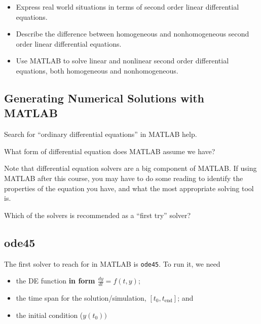 


\newcommand{\Fe}{ F_{\mbox{ext}} }
\newcommand{\Fg}{ F_{\mbox{grav}} }


\setfont
\pagestyle{fancy}
\renewcommand{\Week}{8 }
\renewcommand{\WeekTitle}{\WeekTitleEight }

\fancyhead[LE,RO]{Week \Week}  %
\fancyfoot{}
\sectionbox{Week \#\Week: \WeekTitle}

\vspace{5mm}
\goals
\begin{itemize}
\item Express real world situations in terms of second order linear
  differential equations.
\item Describe the difference between homogeneous and nonhomogeneous
  second order linear differential equations.
\item Use MATLAB to solve linear and nonlinear second order
  differential equations, both homogeneous and nonhomogeneous.
\end{itemize}
\vspace{5mm}

\newpage

\subsection*{Generating Numerical Solutions with MATLAB}

\problem Search for ``ordinary differential equations'' in MATLAB help.  \vsc
\vsc

\problem What form of differential equation does MATLAB assume we have?

\vsc
\vsc


\newpage

Note that differential equation solvers are a big component of MATLAB.
If using MATLAB after this course, you may have to do some reading to
identify the properties of the equation you have, and what the most
appropriate solving tool is.

\problem Which of the solvers is recommended as a ``first try''
solver?

\vsc
\vsc

\newpage

\subsection*{ode45}
The first solver to reach for in MATLAB is \verb#ode45#.  To run it, we need
\begin{itemize} 
\item the DE function {\bf in form $\displaystyle \frac{dy}{dt} = f(t, y)$};
\vfill
\item the time span for the solution/simulation, $[t_0, t_{\mbox{end}}]$; and
\vfill
\item the initial condition ($y(t_0))$
\vfill
\end{itemize}

